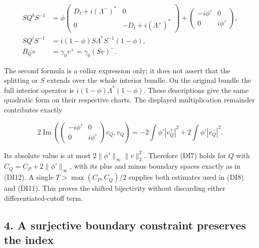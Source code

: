 \documentclass[
  11pt,
]{article}
\makeatletter
\let\ReaderOriginalAnchorStart\hyper@anchorstart
\let\ReaderOriginalAnchorEnd\hyper@anchorend
\let\ReaderPendingAliases\@empty
\def\ReaderArmAliases#1{\gdef\ReaderPendingAliases{#1}}
\def\hyper@anchorstart#1{\ReaderIfNativeAnchorTF{#1}{\ReaderPendingAliases\global\let\ReaderPendingAliases\@empty}{}\ReaderOriginalAnchorStart{#1}}
\makeatother
\begin{document}
\[
 \begin{aligned}
 SQ^bS^{-1}
 &=\phi\begin{pmatrix}
       D_t+i(\Lambda^-)^*&0\\
       0&-D_t+i(\Lambda^+)^*
      \end{pmatrix}
       +\begin{pmatrix}-i\phi'&0\\0&i\phi'\end{pmatrix},\\
 SQ^iS^{-1}&=i(1-\phi)S\Lambda^*S^{-1}(1-\phi),\\
 B_Qv&=\gamma_0v^+=\gamma_0(Sv)^-.
 \end{aligned}
 \tag{DA4}
\]

The second formula is a collar expression only; it does not assert that
the splitting or \(S\) extends over the whole interior bundle. On the
original bundle the full interior operator is
\(i(1-\phi)\Lambda^*(1-\phi)\). These descriptions give the same
quadratic form on their respective charts. The displayed multiplication
remainder contributes exactly

\[
 2\operatorname{Im}
   \left(\begin{pmatrix}-i\phi'&0\\0&i\phi'\end{pmatrix}
                       v_Q,v_Q\right)
   =-2\int\phi'|v_Q^+|^2+2\int\phi'|v_Q^-|^2.
 \tag{DA5}
\]

Its absolute value is at most \(2\|\phi'\|_\infty\|v\|_2^2\). Therefore
(DI7) holds for \(Q\) with \(C_Q=C_P+2\|\phi'\|_\infty\), with its plus
and minus boundary spaces exactly as in (DI12). A single
\(T>\max(C_P,C_Q)/2\) supplies both estimates used in (DI8) and (DI11).
This proves the shifted bijectivity without discarding either
differentiated-cutoff term.

\ReaderArmAliases{\ReaderOriginalAnchorStart{AN03-SDI-004}\ReaderOriginalAnchorEnd\begingroup\expandafter\def\csname @currentHref\endcsname{AN03-SDI-004}\label{AN03-SDI-004}\endgroup\ReaderOriginalAnchorStart{4-a-surjective-boundary-constraint-preserves-the-index}\ReaderOriginalAnchorEnd\begingroup\expandafter\def\csname @currentHref\endcsname{4-a-surjective-boundary-constraint-preserves-the-index}\label{4-a-surjective-boundary-constraint-preserves-the-index}\endgroup\ReaderOriginalAnchorStart{a-surjective-boundary-constraint-preserves-the-index}\ReaderOriginalAnchorEnd}
\subsection{4. A surjective boundary constraint preserves the
index}\label{a-surjective-boundary-constraint-preserves-the-index}
\end{document}
